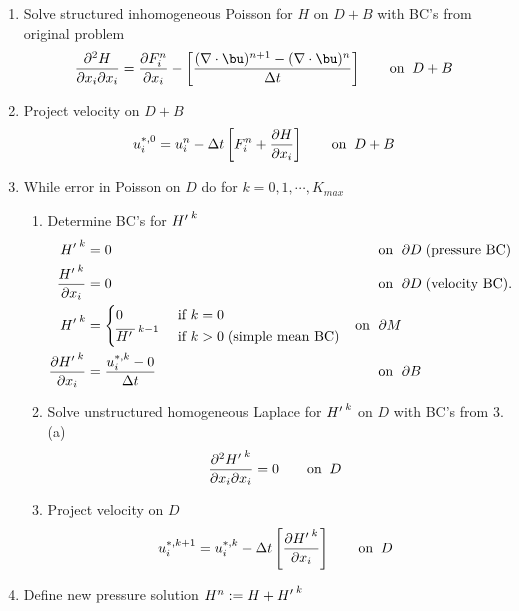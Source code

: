 \begin{enumerate}

\item Solve structured inhomogeneous Poisson for $H$ on $D+B$ with BC's from original problem
\[
\frac{\partial^2 H}{\pxi \pxi}  =  \frac{\partial F_i^n}{\pxi} - \left[   \frac{(\nabla \cdot \bu)	^{n+1} - (\nabla \cdot \bu)^{n} }{\Delta t} \right]  \qquad \mbox{on} \;\;D+B 
\]

\item Project velocity on $D+B$  
\[ u_i^{*,0} = u_i^n - \Delta t \left[ F_i^n + \frac{\partial {H}}{\partial x_i} \right]  \qquad \mbox{on} \;\;D+B  \]

\item While error in Poisson on $D$ do for $k=0, 1, \cdots, K_{max}$

\begin{enumerate}
\item Determine BC's for ${{H'\,}^{k}}$ 
\begin{align} 
\HSK{k}                             & = 0                                            &\mbox{on \;}  &\pD \mbox{\;(pressure BC)} \nonumber \\
\frac{\HSK{k} }{\pxi}           & = 0                                            &\mbox{on \;}  &\pD \mbox{\;(velocity BC)}.  \nonumber \\
\HSK{k}                             & = {\begin{cases} 
                                                0                & \mbox{ if } k=0 \\
                                              \HLO{}{k-1}  & \mbox{ if } k>0  \mbox{\;(simple mean BC)}  \nonumber \\ %
                                            \end{cases} }                           &\mbox{on \;}  \pM \\
\frac{\partial {\HSK{k} }}{\pxi} &= \frac{u_i^{*,k} - 0}{\Delta t}  &\mbox{on \;} &\pB  \nonumber
\end{align}

\item Solve unstructured homogeneous Laplace for ${H'\,}^{k}$ on $D$ with BC's from 3.(a) %
\[   \frac{\partial^2 {H'\,}^{k} }{\partial x_i \partial x_i} = 0 \qquad \mbox{on} \;\; D\]

\item Project velocity on $D$
\[   u_i^{*,{k+1}} =  u_i^{*,k} - \Delta t \left[\frac{\partial {H'\,}^{k}}{\partial x_i} \right]  \qquad \mbox{on} \;\;D  \]

\end{enumerate}
\item Define new pressure solution $H^n := H + {H'\,}^{k}$
\end{enumerate}

